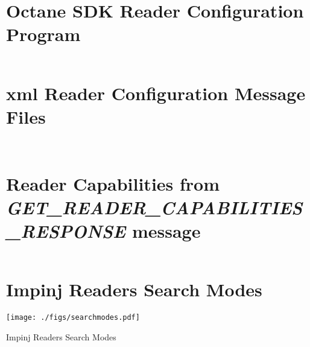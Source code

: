\begin{appendices}
\clearpage

\section{Octane SDK Reader Configuration Program} \label{apx:octanereaderconfig}
\inputminted[linenos, breaklines, frame=single]{java}{./code/App.java}

\clearpage

\section{\acs{xml} Reader Configuration Message Files} \label{apx:xmlreaderconfig}
\inputminted[linenos, breaklines, frame=single]{xml}{./code/SET_READER_CONFIG.xml}
\pagebreak
\inputminted[linenos, breaklines, frame=single]{xml}{./code/ADD_ROSPEC.xml}

\clearpage

\section{Reader Capabilities from \textit{GET\_READER\_CAPABILITIES\_RESPONSE} message}
\label{apx:readercapabilities}
\inputminted[linenos, breaklines, frame=single]{xml}{./code/GET_READER_CAPABILITIES_RESPONSE.xml}

\clearpage

\section{Impinj Readers Search Modes}
\label{apx:searchmodes}
\begin{table}[!ht]
    \centering
    \texttt{[image: ./figs/searchmodes.pdf]}
    \caption{Impinj Readers Search Modes~\cite{ImpinjOctaneLLRP}} 
\end{table}

\end{appendices}